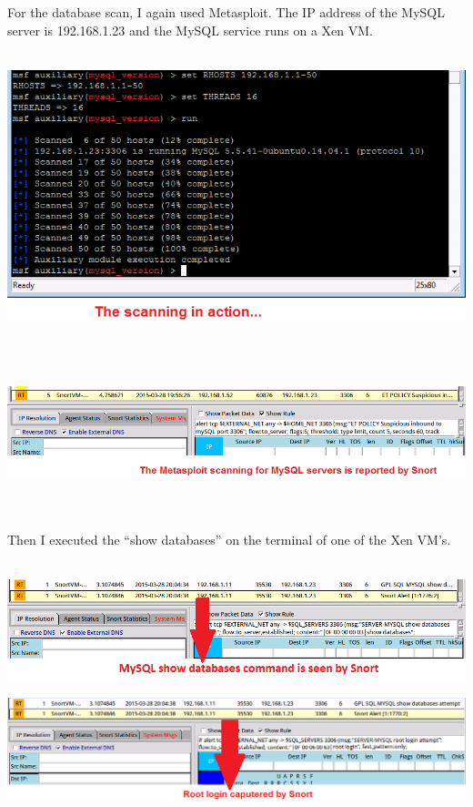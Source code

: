 \documentclass[11pt, a4paper]{article}
\begin{document}
For the database scan, I again used Metasploit. The IP address of the MySQL server is 192.168.1.23 and the MySQL service runs on a Xen VM. \\ \\
\noindent\begin{minipage}{\textwidth}
    \centering
    \includegraphics[width=\textwidth]{MySQL_3.png}
\end{minipage}
$\;$ \\ \\
\noindent\begin{minipage}{\textwidth}
    \centering
    \includegraphics[width=\textwidth]{MySQL_1.png}
\end{minipage}
$\;$ \\ \\
Then I executed the ``show databases'' on the terminal of one of the Xen VM's. \\ \\
\noindent\begin{minipage}{\textwidth}
    \centering
    \includegraphics[width=\textwidth]{MySQL_2.png}
\end{minipage}
\noindent\begin{minipage}{\textwidth}
    \centering
    \includegraphics[width=\textwidth]{MySQL_4.png}
\end{minipage}
\end{document}
